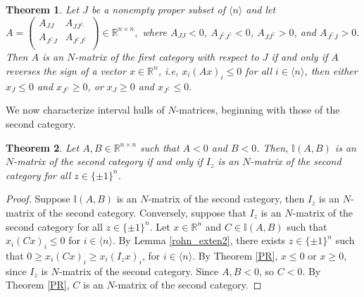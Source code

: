 \documentclass[11pt]{article}
\newtheorem{theorem}{Theorem}[section]
\begin{document}
\begin{theorem}{\cite[Theorem 4.3]{moh-sri-nmat-lcp}} \label{nmat-fir-char}
    Let $J$ be a nonempty proper subset of $\langle n \rangle$ and let $A = \begin{pmatrix}
        A_{JJ} & A_{J J^\complement}\\
        A_{J^\complement J} & A_{J^\complement J^\complement} \\
        \end{pmatrix}\in \mathbb{R}^{n \times n},$ where $A_{JJ} < 0$, $A_{J^\complement J^\complement}<0$, $A_{J J^\complement } >0$, and $A_{J^\complement J}>0.$ Then $A$  is an $N$-matrix of the first category with respect to $J$ if and only if  $A$ reverses the sign of a vector $x \in \mathbb{R}^n$, i.e, $x_i(Ax)_i\leq 0$ for all $i \in \langle n \rangle$, then either $x_J \leq 0$ and $x_{J^\complement} \geq 0$, or $x_J \geq 0$ and $x_{J^\complement} \leq 0.$

\end{theorem}

We now characterize interval hulls of $N$-matrices, beginning with those
of the second category.
\begin{theorem}\label{n hull 2nd}
	Let $A,B \in \mathbb{R}^{n \times n}$ such that $A<0$ and $B<0$.
	Then, $\mathbb{I}(A,B)$ is an $N$-matrix of the second category  if and only if $I_z$ is an $N$-matrix of the second category for all $z\in \{ \pm 1 \}^n$.
\end{theorem}

\begin{proof}
	Suppose $\mathbb{I}(A,B)$ is an $N$-matrix of the second category,
	then $I_z$ is an $N$-matrix of the second category. Conversely,
	suppose that $I_z$ is an $N$-matrix of the second category for all $z\in \{ \pm 1 \}^n$. Let $x \in \mathbb{R}^n$ and $C \in \mathbb{I}(A,B)$ such that $x_i(Cx)_i\leq 0$ for $i\in \langle n \rangle$. By Lemma \ref{rohn_exten2}, there exists  $z\in \{ \pm 1 \}^n$ such that $0\geq x_i (C x)_i \geq x_i(I_z x)_i$, for $i\in \langle n \rangle$. By Theorem \ref{PR}, $x\leq 0$ or $x\geq 0$, since $I_z$ is $N$-matrix of the second category. Since $A,B<0$, so $C<0$. By Theorem \ref{PR}, $C$ is an $N$-matrix of the second category.
\end{proof}
\end{document}
